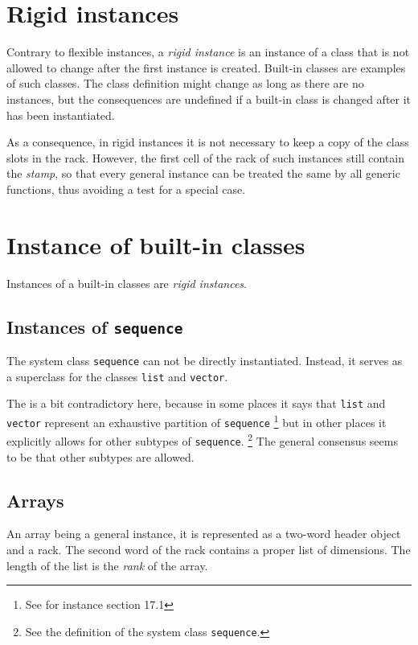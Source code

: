 \section{Rigid instances}
\label{sec-data-representation-rigid-instances}

Contrary to flexible instances, a \emph{rigid instance} is an instance
of a class that is not allowed to change after the first instance is
created.  Built-in classes are examples of such classes.  The class
definition might change as long as there are no instances, but the
consequences are undefined if a built-in class is changed after it has
been instantiated.

As a consequence, in rigid instances it is not necessary to keep a
copy of the class slots in the rack.  However, the first
cell of the rack of such instances still contain the
\emph{stamp}, so that every general instance can be treated the same
by all generic functions, thus avoiding a test for a special case.

\section{Instance of built-in classes}

Instances of a built-in classes are \emph{rigid instances}.

\subsection{Instances of \texttt{sequence}}

The system class \texttt{sequence} can not be directly instantiated.
Instead, it serves as a superclass for the classes \texttt{list} and
\texttt{vector}.

The \hs{} is a bit contradictory here, because
in some places it says that \texttt{list} and \texttt{vector}
represent an exhaustive partition of \texttt{sequence}%
\footnote{See for instance section 17.1}
but in other places it explicitly allows for other subtypes of
\texttt{sequence}.%
\footnote{See the definition of the system class \texttt{sequence}.}
The general consensus seems to be that other subtypes are allowed.


\subsection{Arrays}
\label{sec-data-representation-arrays}

An array being a general instance, it is represented as a two-word
header object and a rack.  The second word of the rack
contains a proper list of dimensions.  The length of the list
is the \emph{rank} of the array.

